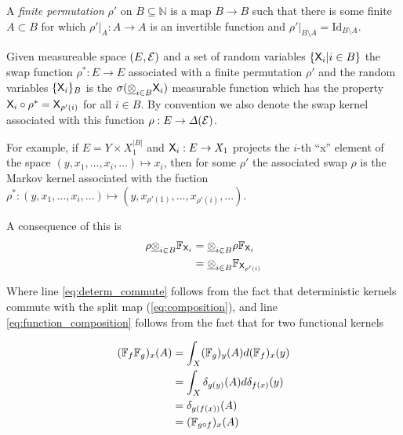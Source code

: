 \begin{definition}
A \emph{finite permutation} $\rho'$ on $B\subseteq\mathbb{N}$ is a map $B\to B$ such that there is some finite $A\subset B$ for which $\rho'|_A:A\to A$ is an invertible function and $\rho'|_{B\setminus A} = \mathrm{Id}_{B\setminus A}$.

Given measureable space $(E,\mathcal{E})$ and a set of random variables $\{\mathsf{X}_i|i\in B\}$ the swap function $\rho^*:E\to E$ associated with a finite permutation $\rho'$ and the random variables $\{\mathsf{X}_i\}_B$ is the $\sigma(\underline{\otimes}_{i\in B}\mathsf{X}_i)$ measurable function which has the property $\mathsf{X}_i\circ \rho^*=\mathsf{X}_{\rho'(i)} $ for all $i\in B$. By convention we also denote the swap kernel associated with this function $\rho:E\to \Delta(\mathcal{E})$.

For example, if $E = Y\times X_1^{|B|}$ and $\mathsf{X}_i:E\to X_1$ projects the $i$-th ``x'' element of the space $(y,x_1,...,x_i,...)\mapsto x_i$, then for some $\rho'$ the associated swap $\rho$ is the Markov kernel associated with the fuction $\rho^*:(y,x_1,...,x_i,...)\mapsto (y,x_{\rho'(1)},...,x_{\rho'(i)},...)$.
\end{definition}

A consequence of this is 
\begin{align}
    \rho\underline{\otimes}_{i\in B} \mathbb{F}_{\mathsf{X}_i} &= \underline{\otimes}_{i\in B} \rho \mathbb{F}_{\mathsf{X}_{i}}\label{eq:determ_commute}\\
                                               &= \underline{\otimes}_{i\in B} \mathbb{F}_{\mathsf{X}_{\rho'(i)}}\label{eq:function_composition}
\end{align}

Where line \ref{eq:determ_commute} follows from the fact that deterministic kernels commute with the split map (\ref{eq:composition}), and line \ref{eq:function_composition} follows from the fact that for two functional kernels 

\begin{align}
    (\mathbb{F}_{f}\mathbb{F}_g)_x(A) &= \int_X (\mathbb{F}_g)_y(A) d(\mathbb{F}_f)_x(y)\\
                                      &= \int_X \delta_{g(y)}(A) d\delta_{f(x)}(y)\\
                                      &= \delta_{g(f(x))} (A)\\
                                      &= (\mathbb{F}_{g\circ f})_x(A) 
\end{align}



